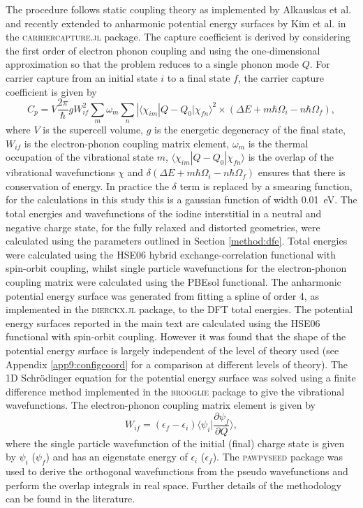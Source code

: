The procedure follows static coupling theory as implemented by Alkauskas et al.\autocite{Alkauskas2014} and recently extended to anharmonic potential energy surfaces by Kim et al. in the \textsc{carriercapture.jl} package.\autocite{Kim2019}
The capture coefficient is derived by considering the first order of electron phonon coupling and using the one-dimensional approximation so that the problem reduces to a single phonon mode $Q$. For carrier capture from an initial state $i$ to a final state $f$, the carrier capture coefficient is given by
\begin{equation}
    C_p = V\frac{2\pi}{\hbar}gW_{if}^2\sum_m\omega_m\sum_n|\langle\chi_{im}|Q-Q_0|\chi_{fn}\rangle^2\times (\Delta E+m\hbar\Omega_i-n\hbar\Omega_f),
\end{equation}
where $V$ is the supercell volume, $g$ is the energetic degeneracy of the final state, $W_{if}$ is the electron-phonon coupling matrix element, $\omega_m$ is the thermal occupation of the vibrational state $m$, $\langle\chi_{im}|Q-Q_0|\chi_{fn}\rangle$ is the overlap of the vibrational wavefunctions $\chi$ and $\delta(\Delta E+m\hbar\Omega_i-n\hbar\Omega_f)$ ensures that there is conservation of energy. In practice the $\delta$ term is replaced by a smearing function, for the calculations in this study this is a gaussian function of width \SI{0.01}{\electronvolt}.
The total energies and wavefunctions of the iodine interstitial in a neutral and negative charge state, for the fully relaxed and distorted geometries, were calculated using the parameters outlined in Section \ref{method:dfe}. Total energies were calculated using the HSE06 hybrid exchange-correlation functional with spin-orbit coupling, whilst single particle wavefunctions for the electron-phonon coupling matrix were calculated using the PBEsol functional.
The anharmonic potential energy surface was generated from fitting a spline of order 4, as implemented in the \textsc{dierckx.jl} package,\autocite{dierckx} to the DFT total energies. 
The potential energy surfaces reported in the main text are calculated using the HSE06 functional with spin-orbit coupling. However it was found that the shape of the potential energy surface is largely independent of the level of theory used (see Appendix \ref{app9:configcoord} for a comparison at different levels of theory).
The 1D Schr\"{o}dinger equation for the potential energy surface was solved using a finite difference method implemented in the \textsc{brooglie} package\autocite{brooglie} to give the vibrational wavefunctions. 
The electron-phonon coupling matrix element is given by
\begin{equation}
    W_{if} = (\epsilon_f-\epsilon_i)\langle\psi_i|\frac{\partial\psi_f}{\partial Q}\rangle,
\end{equation}
where the single particle wavefunction of the initial (final) charge state is given by $\psi_i$ ($\psi_f$) and has an eigenstate energy of $\epsilon_i$ ($\epsilon_f$). The \textsc{pawpyseed} package\autocite{pawpyseed} was used to derive the orthogonal wavefunctions from the  pseudo wavefunctions and perform the overlap integrals in real space.
Further details of  the  methodology  can  be  found  in  the  literature.\autocite{Alkauskas2014} 

